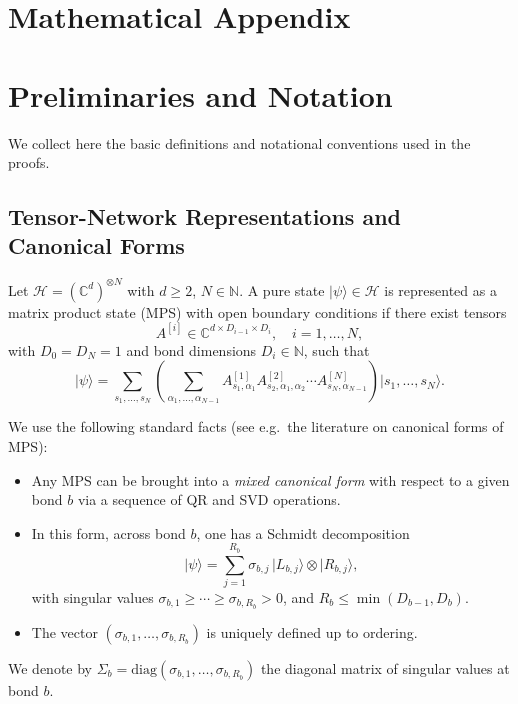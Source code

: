 \documentclass[11pt]{article}
\begin{document}
\appendix
\section*{Mathematical Appendix}

\section{Preliminaries and Notation}

We collect here the basic definitions and notational conventions used in the proofs.

\subsection{Tensor-Network Representations and Canonical Forms}

Let $\mathcal{H} = (\mathbb{C}^d)^{\otimes N}$ with $d \ge 2$, $N \in \mathbb{N}$. A pure state $\lvert \psi \rangle \in \mathcal{H}$ is represented as a matrix product state (MPS) with open boundary conditions if there exist tensors
\[
A^{[i]} \in \mathbb{C}^{d \times D_{i-1} \times D_i}, \quad i = 1,\dots,N,
\]
with $D_0 = D_N = 1$ and bond dimensions $D_i \in \mathbb{N}$, such that
\[
\lvert \psi \rangle
= \sum_{s_1,\dots,s_N} 
\left( \sum_{\alpha_1,\dots,\alpha_{N-1}}
A^{[1]}_{s_1,\alpha_1}
A^{[2]}_{s_2,\alpha_1,\alpha_2}
\cdots
A^{[N]}_{s_N,\alpha_{N-1}} \right)
\lvert s_1,\dots,s_N \rangle.
\]

We use the following standard facts (see e.g.\ the literature on canonical forms of MPS):
\begin{itemize}
    \item Any MPS can be brought into a \emph{mixed canonical form} with respect to a given bond $b$ via a sequence of QR and SVD operations.
    \item In this form, across bond $b$, one has a Schmidt decomposition
    \[
    \lvert \psi \rangle
    = \sum_{j=1}^{R_b} \sigma_{b,j} \, \lvert L_{b,j} \rangle \otimes \lvert R_{b,j} \rangle,
    \]
    with singular values $\sigma_{b,1} \ge \cdots \ge \sigma_{b,R_b} > 0$, and $R_b \le \min(D_{b-1}, D_b)$.
    \item The vector $(\sigma_{b,1},\dots,\sigma_{b,R_b})$ is uniquely defined up to ordering.
\end{itemize}

We denote by $\Sigma_b = \mathrm{diag}(\sigma_{b,1},\dots,\sigma_{b,R_b})$ the diagonal matrix of singular values at bond $b$.
\end{document}
